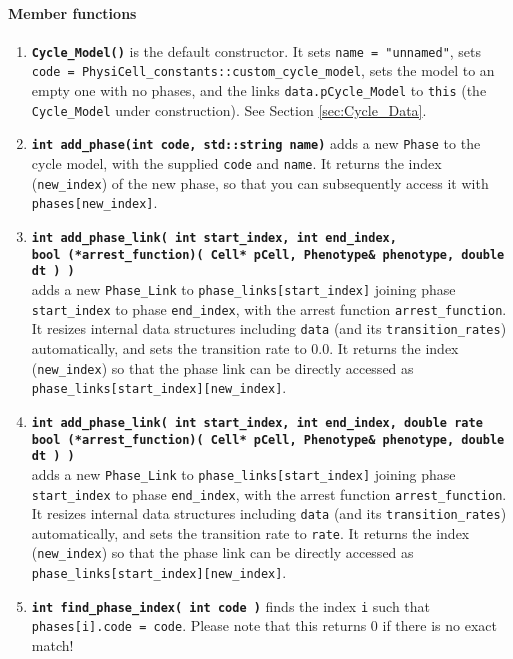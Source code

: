 \documentclass[12pt]{article}
\renewcommand{\v}{\verb}
\newcommand{\smallcode}[1]{\textbf{\texttt{#1}}}
\begin{document}
\paragraph{Member functions}
\begin{enumerate}
\item
\smallcode{Cycle\_Model()} is the default constructor. It sets \v|name = "unnamed"|, sets \hfill\break
\v|code = PhysiCell_constants::custom_cycle_model|, sets the model to an empty 
one with no phases, and the links \v|data.pCycle_Model| to \v|this| (the 
\v|Cycle_Model| under construction). See Section \ref{sec:Cycle_Data}. 

\item 
\smallcode{int add\_phase(int code, std::string name)} 
adds a new \v|Phase| to the cycle model, 
with the supplied \v|code| and \v|name|. It returns the index (\v|new_index|) of the new phase, so that 
you can subsequently access it with \v|phases[new_index]|. 

\item 
\smallcode{int add\_phase\_link( int start\_index, int end\_index, \\
\phantom{int }bool (*arrest\_function)( Cell* pCell, Phenotype\& phenotype, double dt ) )} \\
adds a new \v|Phase_Link| to 
\v|phase_links[start_index]| joining phase \v|start_index| to phase \v|end_index|, with the 
arrest function \v|arrest_function|. It resizes internal data structures including 
\v|data| (and its \v|transition_rates|) automatically, and sets the 
transition rate to 0.0. It returns the index (\v|new_index|) so that the 
phase link can be directly accessed as \v|phase_links[start_index][new_index]|. 

\item 
\smallcode{int add\_phase\_link( int start\_index, int end\_index, double rate\\
\phantom{int }bool (*arrest\_function)( Cell* pCell, Phenotype\& phenotype, double dt ) )} \\
adds a new \v|Phase_Link| to 
\v|phase_links[start_index]| joining phase \v|start_index| to phase \v|end_index|, with the 
arrest function \v|arrest_function|. It resizes internal data structures including 
\v|data| (and its \v|transition_rates|) automatically, and sets the 
transition rate to \v|rate|. It returns the index (\v|new_index|) so that the 
phase link can be directly accessed as \v|phase_links[start_index][new_index]|. 

\item 
\smallcode{int find\_phase\_index( int code )} finds the index \v|i| such that 
\v|phases[i].code = code|. Please note that this returns 0 if there is 
no exact match!   


\end{enumerate}
\end{document}
